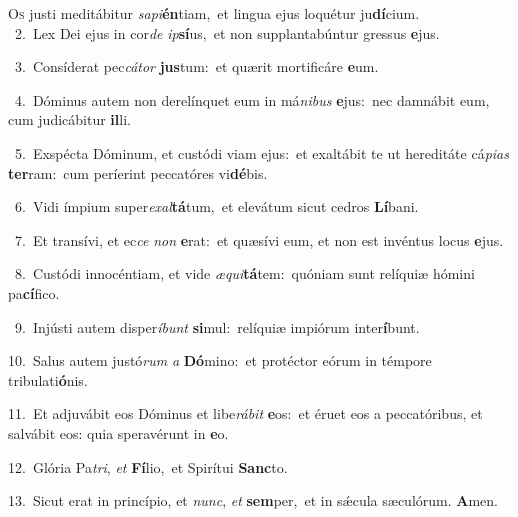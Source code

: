 \lettrine{\initial\textcolor{\initialcolor}{O}}{s} justi meditábitur \textit{sa}\-\textit{pi}\textbf{én}tiam,~\star et lingua ejus loquétur ju\-\textbf{dí}\-cium.\\
{\numbfont\textcolor{\numbcolor}{~2.}}~Lex Dei ejus in cor\textit{de} \textit{ip}\-\textbf{sí}us,~\star et non supplantabúntur gressus \textbf{e}\-jus.\par
{\numbfont\textcolor{\numbcolor}{~3.}}~Consíderat pec\-\textit{cá}\-\textit{tor} \textbf{jus}\-tum:~\star et quærit mortificáre \textbf{e}\-um.\par
{\numbfont\textcolor{\numbcolor}{~4.}}~Dóminus autem non derelínquet eum in má\-\textit{ni}\-\textit{bus} \textbf{e}\-jus:~\star nec damnábit eum, cum judicábitur \textbf{il}\-li.\par
{\numbfont\textcolor{\numbcolor}{~5.}}~Exspécta Dóminum, et custódi viam ejus:~\dagger et exaltábit te ut hereditáte cá\-\textit{pi}\-\textit{as} \textbf{ter}\-ram:~\star cum períerint peccatóres vi\-\textbf{dé}\-bis.\par
{\numbfont\textcolor{\numbcolor}{~6.}}~Vidi ímpium super\-\textit{ex}\-\textit{al}\textbf{tá}tum,~\star et elevátum sicut cedros \textbf{Lí}\-bani.\par
{\numbfont\textcolor{\numbcolor}{~7.}}~Et transívi, et ec\textit{ce} \textit{non} \textbf{e}\-rat:~\star et quæsívi eum, et non est invéntus locus \textbf{e}\-jus.\par
{\numbfont\textcolor{\numbcolor}{~8.}}~Custódi innocéntiam, et vide \textit{æ}\-\textit{qui}\textbf{tá}tem:~\star quóniam sunt relíquiæ hómini pa\-\textbf{cí}\-fico.\par
{\numbfont\textcolor{\numbcolor}{~9.}}~Injústi autem disper\-\textit{í}\-\textit{bunt} \textbf{si}\-mul:~\star relíquiæ impiórum inter\-\textbf{í}\-bunt.\par
{\numbfont\textcolor{\numbcolor}{10.}}~Salus autem justó\textit{rum} \textit{a} \textbf{Dó}\-mino:~\star et protéctor eórum in témpore tribulati\-\textbf{ó}\-nis.\par
{\numbfont\textcolor{\numbcolor}{11.}}~Et adjuvábit eos Dóminus et libe\-\textit{rá}\-\textit{bit} \textbf{e}\-os:~\star et éruet eos a peccatóribus, et salvábit eos: quia speravérunt in \textbf{e}\-o.\par
{\numbfont\textcolor{\numbcolor}{12.}}~Glória Pa\-\textit{tri}\-, \textit{et} \textbf{Fí}\-lio,~\star et Spirítui \textbf{Sanc}\-to.\par
{\numbfont\textcolor{\numbcolor}{13.}}~Sicut erat in princípio, et \textit{nunc}\-, \textit{et} \textbf{sem}\-per,~\star et in sǽcula sæculórum. \textbf{A}\-men.\par
